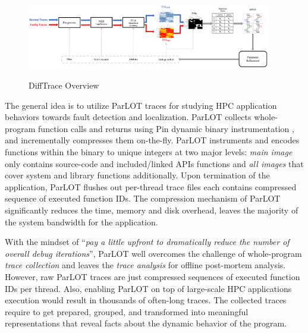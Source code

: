 \begin{figure}[]
\caption{DiffTrace Overview}
\includegraphics[width=0.95\textwidth]{figs/overview.png}
\label{fig.diffTraceOverview}
\end{figure}

The general idea is to utilize ParLOT \cite{ parlot} traces for studying HPC application behaviors towards fault detection and localization.
%
ParLOT collects whole-program function calls and returns using Pin dynamic binary instrumentation \cite{pin}, and incrementally compresses them on-the-fly.
%
ParLOT instruments and encodes functions within the binary to unique integers at two major levels: \textit{main image} only contains source-code and included/linked APIs functions and \textit{all images} that cover system and library functions additionally.
%
Upon termination of the application, ParLOT flushes out per-thread trace files each contains compressed sequence of executed function IDs.
%
The compression mechanism of ParLOT significantly reduces the time, memory and disk overhead, leaves the majority of the system bandwidth for the application. 
%

With the mindset of ``\textit{pay a little upfront to dramatically reduce the number of overall debug iterations}'', ParLOT well overcomes the challenge of whole-program \textit{trace collection} and leaves the \textit{trace analysis} for offline post-mortem analysis. 
%
However, raw ParLOT traces are just compressed sequences of executed function IDs per thread.
%
Also, enabling ParLOT on top of large-scale HPC applications execution would result in thousands of often-long traces.
%
The collected traces require to get prepared, grouped, and transformed into meaningful representations that reveal facts about the dynamic behavior of the program.

